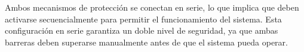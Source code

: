Ambos mecanismos de protección se conectan en serie, lo que implica que deben activarse secuencialmente para permitir el funcionamiento del sistema. Esta configuración en serie garantiza un doble nivel de seguridad, ya que ambas barreras deben superarse manualmente antes de que el sistema pueda operar.








